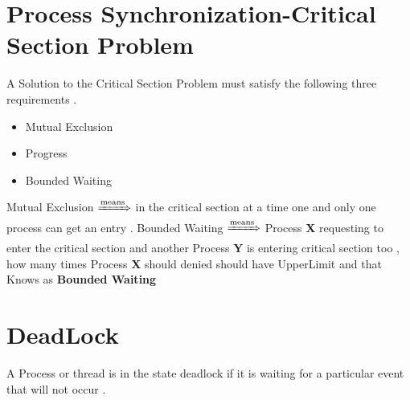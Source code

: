 \documentclass[12pt]{article}
\begin{document}
\section{Process Synchronization-Critical Section Problem}

A Solution to the Critical Section Problem must satisfy the following three requirements .

\begin{itemize}
	\item Mutual Exclusion
	\item Progress
	\item Bounded Waiting
\end{itemize}


\noindent
Mutual Exclusion $\xRightarrow{\text{means}}$ in the critical section at a time one and only one process can get an entry .
\newline\newline
\noindent
Bounded Waiting $\xRightarrow{\text{means}}$ Process \textbf{X} requesting to enter the critical section and another Process \textbf{Y} is entering critical section too , how many times Process \textbf{X} should denied should have UpperLimit and that Knows as \textbf{Bounded Waiting}






\section{DeadLock}


A Process or thread is in the state deadlock if it is waiting for a particular event that will not occur .
\end{document}
